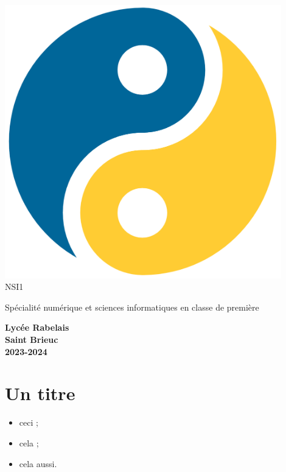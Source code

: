 \documentclass{nsibook}
\begin{document}
\begin{titlepage}
    \begin{center}
        \includegraphics[width=12cm]{yin_yang_python.png}\\[2em]

        {\bigtitlefont \LARGE\color{gray} NSI1}

        {\titlefont\Large\color{gray} Spécialité numérique et sciences informatiques en classe de première\\[2em]}

        {\color{gray}\textbf{Lycée Rabelais\\ Saint Brieuc\\ 2023-2024}}
    \end{center}
\end{titlepage}
\chapter{Un titre}
 
\begin{aretenir}
    \begin{itemize}
        \item ceci ;
        \item cela ;
        \item cela aussi.
    \end{itemize}
\end{aretenir}
\end{document}
